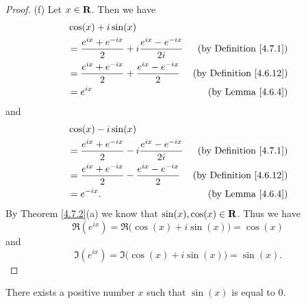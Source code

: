\begin{proof}{(f)}
    Let \(x \in \mathbf{R}\).
    Then we have
    \begin{align*}
         & \cos(x) + i \sin(x)                                                                                      \\
         & = \frac{e^{i x} + e^{- i x}}{2} + i \frac{e^{i x} - e^{- i x}}{2i} & \text{(by Definition \ref{4.7.1})}  \\
         & = \frac{e^{i x} + e^{- i x}}{2} + \frac{e^{i x} - e^{- i x}}{2}    & \text{(by Definition \ref{4.6.12})} \\
         & = e^{i x}                                                          & \text{(by Lemma \ref{4.6.4})}
    \end{align*}
    and
    \begin{align*}
         & \cos(x) - i \sin(x)                                                                                      \\
         & = \frac{e^{i x} + e^{- i x}}{2} - i \frac{e^{i x} - e^{- i x}}{2i} & \text{(by Definition \ref{4.7.1})}  \\
         & = \frac{e^{i x} + e^{- i x}}{2} - \frac{e^{i x} - e^{- i x}}{2}    & \text{(by Definition \ref{4.6.12})} \\
         & = e^{- i x}.                                                       & \text{(by Lemma \ref{4.6.4})}
    \end{align*}
    By Theorem \ref{4.7.2}(a) we know that \(\sin(x), \cos(x) \in \mathbf{R}\).
    Thus we have
    \[
        \Re(e^{i x}) = \Re\big(\cos(x) + i \sin(x)\big) = \cos(x)
    \]
    and
    \[
        \Im(e^{i x}) = \Im\big(\cos(x) + i \sin(x)\big) = \sin(x).
    \]
\end{proof}

\begin{lemma}\label{4.7.3}
    There exists a positive number \(x\) such that \(\sin(x)\) is equal to \(0\).
\end{lemma}


